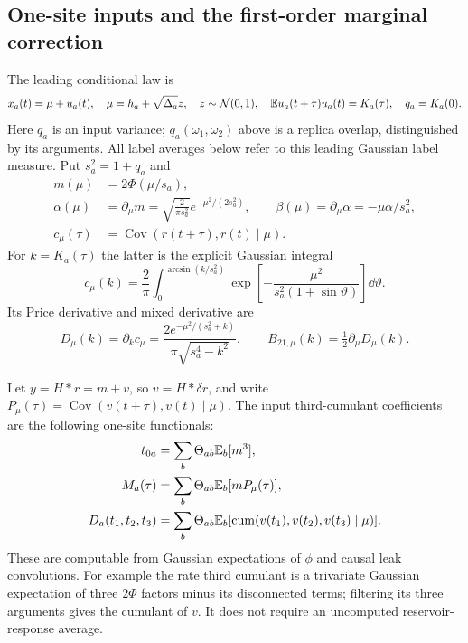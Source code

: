 \subsection{One-site inputs and the first-order marginal correction}
The leading conditional law is
\[
 x_a(t)=\mu+u_a(t),\quad
 \mu=h_a+\sqrt{\Delta_a}z,\quad z\sim\mathcal N(0,1),\quad
 \mathbb E u_a(t+\tau)u_a(t)=K_a(\tau),\quad q_a=K_a(0).
\]
Here $q_a$ is an input variance; $q_a(\omega_1,\omega_2)$ above is a
replica overlap, distinguished by its arguments. All label averages below
refer to this leading Gaussian label measure. Put $s_a^2=1+q_a$ and
\begin{align*}
 m(\mu)&=2\Phi(\mu/s_a),\\
 \alpha(\mu)&=\partial_\mu m
 =\sqrt{\frac2{\pi s_a^2}}e^{-\mu^2/(2s_a^2)},\qquad
 \beta(\mu)=\partial_\mu\alpha=-\mu\alpha/s_a^2,\\
 c_\mu(\tau)&=\operatorname{Cov}(r(t+\tau),r(t)\mid\mu).
\end{align*}
For $k=K_a(\tau)$ the latter is the explicit Gaussian integral
\[
 c_\mu(k)=\frac2\pi\int_0^{\arcsin(k/s_a^2)}
     \exp\left[-\frac{\mu^2}{s_a^2(1+\sin\vartheta)}\right]\dd\vartheta.
\]
Its Price derivative and mixed derivative are
\[
 D_\mu(k)=\partial_kc_\mu
 =\frac{2e^{-\mu^2/(s_a^2+k)}}{\pi\sqrt{s_a^4-k^2}},\qquad
 B_{21,\mu}(k)=\tfrac12\partial_\mu D_\mu(k).
\]

Let $y=H*r=m+v$, so $v=H*\delta r$, and write
$P_\mu(\tau)=\operatorname{Cov}(v(t+\tau),v(t)\mid\mu)$. The input
third-cumulant coefficients are the following one-site functionals:
\begin{align*}
 t_{0a}&=\sum_b\Theta_{ab}\mathbb E_b[m^3],\\
 M_a(\tau)&=\sum_b\Theta_{ab}\mathbb E_b[mP_\mu(\tau)],\\
 D_a(t_1,t_2,t_3)&=\sum_b\Theta_{ab}
       \mathbb E_b[\operatorname{cum}(v(t_1),v(t_2),v(t_3)\mid\mu)].
\end{align*}
These are computable from Gaussian expectations of $\phi$ and causal leak
convolutions. For example the rate third cumulant is a trivariate Gaussian
expectation of three $2\Phi$ factors minus its disconnected terms; filtering
its three arguments gives the cumulant of $v$. It does not require an
uncomputed reservoir-response average.


